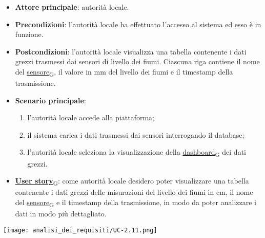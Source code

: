 \newpage
{}
\begin{itemize}
	\item \textbf{Attore principale}: autorità locale.
	\item \textbf{Precondizioni}: l'autorità locale ha effettuato l'accesso al sistema ed esso è in funzione.
	\item \textbf{Postcondizioni}: l'autorità locale visualizza una tabella contenente i dati grezzi trasmessi dai sensori di livello dei fiumi.
	      Ciascuna riga contiene il nome del \href{https://7last.github.io/docs/pb/documentazione-interna/glossario\#sensore}{sensore\textsubscript{G}}, il valore in mm del livello dei fiumi e il timestamp della trasmissione.
	\item \textbf{Scenario principale}:
	      \begin{enumerate}
		      \item l'autorità locale accede alla piattaforma;
		      \item il sistema carica i dati trasmessi dai sensori interrogando il database;
		      \item l'autorità locale seleziona la visualizzazione della \href{https://7last.github.io/docs/pb/documentazione-interna/glossario\#dashboard}{dashboard\textsubscript{G}} dei dati grezzi.
	      \end{enumerate}
	\item \href{https://7last.github.io/docs/pb/documentazione-interna/glossario\#user-story}{\textbf{User story}\textsubscript{G}}:
	      come autorità locale desidero poter visualizzare una tabella contenente i dati grezzi delle misurazioni del livello dei fiumi in cm,
	      il nome del \href{https://7last.github.io/docs/pb/documentazione-interna/glossario\#sensore}{sensore\textsubscript{G}} e il timestamp della trasmissione, in modo da poter analizzare i dati in modo più dettagliato.
\end{itemize}
\begin{center}
	\texttt{[image: analisi\_dei\_requisiti/UC-2.11.png]}
\end{center}

